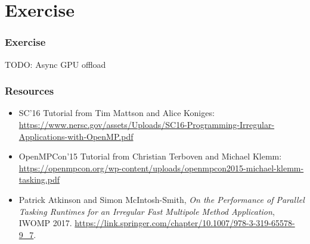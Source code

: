 \documentclass{beamer}
\begin{document}
\section{Exercise}
\begin{frame}
\frametitle{Exercise}
TODO: Async GPU offload
\end{frame}

\begin{frame}
\frametitle{Resources}
\begin{itemize}
  \item SC'16 Tutorial from Tim Mattson and Alice Koniges: \url{https://www.nersc.gov/assets/Uploads/SC16-Programming-Irregular-Applications-with-OpenMP.pdf}
  \item OpenMPCon'15 Tutorial from Christian Terboven and Michael Klemm: \url{https://openmpcon.org/wp-content/uploads/openmpcon2015-michael-klemm-tasking.pdf}
  \item Patrick Atkinson and Simon McIntosh-Smith, \emph{On the Performance of Parallel Tasking Runtimes for an Irregular Fast Multipole Method Application}, IWOMP 2017. \url{https://link.springer.com/chapter/10.1007/978-3-319-65578-9_7}.
\end{itemize}
\end{frame}
\end{document}
